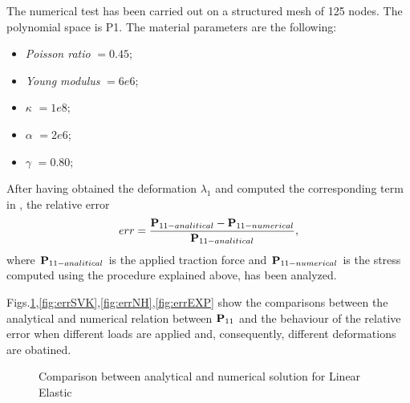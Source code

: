 The numerical test has been carried out on a
structured mesh of 125 nodes. The polynomial space is P1. The material
parameters are the following:
\begin{itemize}
\item \textit{Poisson ratio} $= 0.45$;
\item \textit{Young modulus} $= 6e6$;
\item $\kappa$ $=1e8$;
\item $\alpha$ $=2e6$;
\item $\gamma$ $=0.80$;
\end{itemize}
After having obtained the deformation $\lambda_1$ and
computed the corresponding term in \Piola{}, the relative error
\begin{equation} err = \displaystyle
  \frac{\textbf{P}_{11-analitical}-\textbf{P}_{11-numerical}}{\textbf{P}_{11-analitical}},
\end{equation}
where $\textbf{P}_{11-analitical}$ is the applied traction
force and $\textbf{P}_{11-numerical}$ is the stress computed using the
procedure explained above, has been analyzed.

Figs.\ref{fig:errLE},\ref{fig:errSVK},\ref{fig:errNH},\ref{fig:errEXP}
show the comparisons between the analytical and numerical relation
between $\textbf{P}_{11}$ and the behaviour of the relative error when
different loads are applied and, consequently, different deformations
are obatined.

\begin{figure}[h!]
  \centering
  \caption{Comparison between analytical and numerical solution for
    Linear Elastic}
  \label{fig:errLE}
\end{figure}

